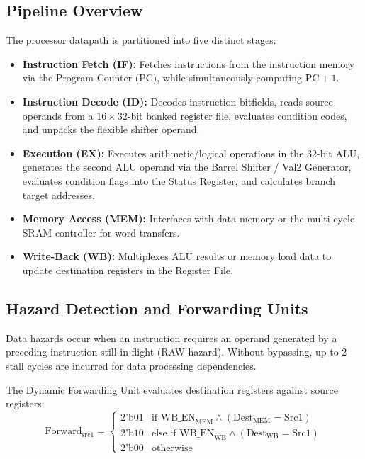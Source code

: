 \documentclass[conference]{IEEEtran}
\begin{document}
\subsection{Pipeline Overview}
The processor datapath is partitioned into five distinct stages:
\begin{itemize}
    \item \textbf{Instruction Fetch (IF):} Fetches instructions from the instruction memory via the Program Counter (PC), while simultaneously computing $\text{PC}+1$.
    \item \textbf{Instruction Decode (ID):} Decodes instruction bitfields, reads source operands from a $16 \times 32$-bit banked register file, evaluates condition codes, and unpacks the flexible shifter operand.
    \item \textbf{Execution (EX):} Executes arithmetic/logical operations in the 32-bit ALU, generates the second ALU operand via the Barrel Shifter / Val2 Generator, evaluates condition flags into the Status Register, and calculates branch target addresses.
    \item \textbf{Memory Access (MEM):} Interfaces with data memory or the multi-cycle SRAM controller for word transfers.
    \item \textbf{Write-Back (WB):} Multiplexes ALU results or memory load data to update destination registers in the Register File.
\end{itemize}

\subsection{Hazard Detection and Forwarding Units}
Data hazards occur when an instruction requires an operand generated by a preceding instruction still in flight (RAW hazard). Without bypassing, up to 2 stall cycles are incurred for data processing dependencies. 

The Dynamic Forwarding Unit evaluates destination registers against source registers:
\begin{equation}
\text{Forward}_{\text{src1}} = 
\begin{cases}
2\text{'b01} & \text{if } \text{WB\_EN}_{\text{MEM}} \land (\text{Dest}_{\text{MEM}} = \text{Src1}) \\
2\text{'b10} & \text{else if } \text{WB\_EN}_{\text{WB}} \land (\text{Dest}_{\text{WB}} = \text{Src1}) \\
2\text{'b00} & \text{otherwise}
\end{cases}
\end{equation}
\end{document}

